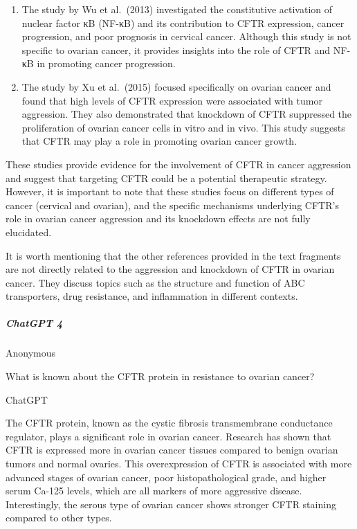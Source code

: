 \begin{enumerate}
\def\labelenumi{\arabic{enumi}.}
\item
  The study by Wu et al.~(2013) investigated the constitutive activation of nuclear factor κB (NF-κB) and its contribution to CFTR expression, cancer progression, and poor prognosis in cervical cancer. Although this study is not specific to ovarian cancer, it provides insights into the role of CFTR and NF-κB in promoting cancer progression.
\item
  The study by Xu et al.~(2015) focused specifically on ovarian cancer and found that high levels of CFTR expression were associated with tumor aggression. They also demonstrated that knockdown of CFTR suppressed the proliferation of ovarian cancer cells in vitro and in vivo. This study suggests that CFTR may play a role in promoting ovarian cancer growth.
\end{enumerate}

These studies provide evidence for the involvement of CFTR in cancer aggression and suggest that targeting CFTR could be a potential therapeutic strategy. However, it is important to note that these studies focus on different types of cancer (cervical and ovarian), and the specific mechanisms underlying CFTR's role in ovarian cancer aggression and its knockdown effects are not fully elucidated.

It is worth mentioning that the other references provided in the text fragments are not directly related to the aggression and knockdown of CFTR in ovarian cancer. They discuss topics such as the structure and function of ABC transporters, drug resistance, and inflammation in different contexts.

\hypertarget{chatgpt-4}{%
\subparagraph{ChatGPT 4}\label{chatgpt-4}}

Anonymous

What is known about the CFTR protein in resistance to ovarian cancer?

ChatGPT

The CFTR protein, known as the cystic fibrosis transmembrane conductance regulator, plays a significant role in ovarian cancer. Research has shown that CFTR is expressed more in ovarian cancer tissues compared to benign ovarian tumors and normal ovaries. This overexpression of CFTR is associated with more advanced stages of ovarian cancer, poor histopathological grade, and higher serum Ca-125 levels, which are all markers of more aggressive disease. Interestingly, the serous type of ovarian cancer shows stronger CFTR staining compared to other types.

